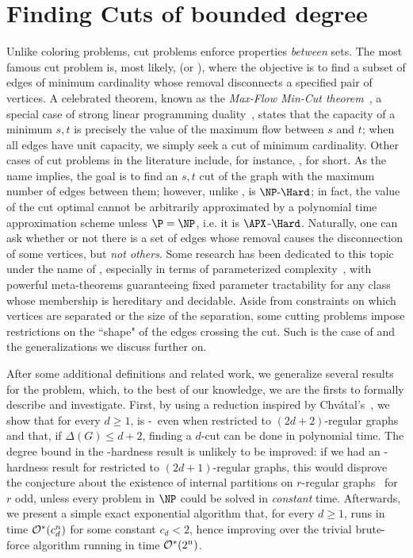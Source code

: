 \chapter{Finding Cuts of bounded degree}
\label{ch:cuts}
Unlike coloring problems, cut problems enforce properties \textit{between} sets.
The most famous cut problem is, most likely,  (or ), where the objective is to find a subset of edges of minimum cardinality whose removal disconnects a specified pair of vertices.
A celebrated theorem, known as the \textit{Max-Flow Min-Cut theorem}~\citep{ford_fulkerson}, a special case of strong linear programming duality~\citep{linear_optimization}, states that the capacity of a minimum $s,t$ is precisely the value of the maximum flow between $s$ and $t$; when all edges have unit capacity, we simply seek a cut of minimum cardinality.
Other cases of cut problems in the literature include, for instance, ,  for short.
As the name implies, the goal is to find an $s,t$ cut of the graph with the maximum number of edges between them; however, unlike ,  is $\NPH$; in fact, the value of the cut optimal cannot be arbitrarily approximated by a polynomial time approximation scheme unless $\P = \NP$, i.e. it is $\APX$-$\Hard$.
Naturally, one can ask whether or not there is a set of edges whose removal causes the disconnection of some vertices, but \textit{not others}.
Some research has been dedicated to this topic under the name of , especially in terms of parameterized complexity~\citep{marx_treewidth_reduction,marx_separation}, with powerful meta-theorems guaranteeing fixed parameter tractability for any class whose membership is hereditary and decidable.
Aside from constraints on which vertices are separated or the size of the separation, some cutting problems impose restrictions on the ``shape" of the edges crossing the cut.
Such is the case of  and the generalizations we discuss further on.

After some additional definitions and related work, we generalize several results for the  problem, which, to the best of our knowledge, we are the firsts to formally describe and investigate.
First, by using a reduction inspired by Chvátal's~\citep{chvatal_matching_cut}, we show that for every $d \geq 1$,  is \NP-\Complete\ even when restricted to $(2d+2)$-regular graphs and that, if $\Delta(G) \leq d+2$, finding a $d$-cut can be done in polynomial time. The degree bound in the \NP-hardness result is unlikely to be improved: if we had an \NP-hardness result for  restricted to $(2d+1)$-regular graphs, this would disprove the conjecture about the existence of internal partitions on $r$-regular graphs~\citep{DeVos09,internal_partition_regular6,internal_partition_regular3_4} for $r$ odd, unless every problem in $\NP$ could be solved in \textit{constant} time.
Afterwards, we present a simple exact exponential algorithm that, for every $d \geq 1$, runs in time $\mathcal{O}^*\!\left(c_d^n\right)$ for some constant $c_d < 2$, hence improving over the trivial brute-force algorithm running in time $\mathcal{O}^*\!\left(2^n\right)$.

